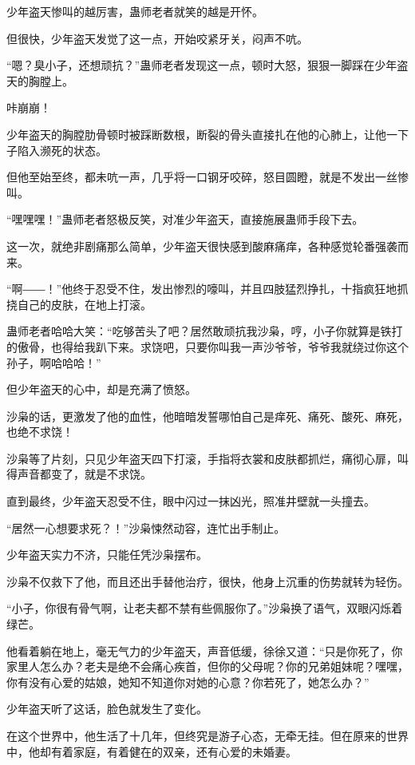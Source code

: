 
\begin{this_body}

少年盗天惨叫的越厉害，蛊师老者就笑的越是开怀。

但很快，少年盗天发觉了这一点，开始咬紧牙关，闷声不吭。

“嗯？臭小子，还想顽抗？”蛊师老者发现这一点，顿时大怒，狠狠一脚踩在少年盗天的胸膛上。

咔崩崩！

少年盗天的胸膛肋骨顿时被踩断数根，断裂的骨头直接扎在他的心肺上，让他一下子陷入濒死的状态。

但他至始至终，都未吭一声，几乎将一口钢牙咬碎，怒目圆瞪，就是不发出一丝惨叫。

“嘿嘿嘿！”蛊师老者怒极反笑，对准少年盗天，直接施展蛊师手段下去。

这一次，就绝非剧痛那么简单，少年盗天很快感到酸麻痛痒，各种感觉轮番强袭而来。

“啊――！”他终于忍受不住，发出惨烈的嚎叫，并且四肢猛烈挣扎，十指疯狂地抓挠自己的皮肤，在地上打滚。

蛊师老者哈哈大笑：“吃够苦头了吧？居然敢顽抗我沙枭，哼，小子你就算是铁打的傲骨，也得给我趴下来。求饶吧，只要你叫我一声沙爷爷，爷爷我就绕过你这个孙子，啊哈哈哈！”

但少年盗天的心中，却是充满了愤怒。

沙枭的话，更激发了他的血性，他暗暗发誓哪怕自己是痒死、痛死、酸死、麻死，也绝不求饶！

沙枭等了片刻，只见少年盗天四下打滚，手指将衣裳和皮肤都抓烂，痛彻心扉，叫得声音都变了，就是不求饶。

直到最终，少年盗天忍受不住，眼中闪过一抹凶光，照准井壁就一头撞去。

“居然一心想要求死？！”沙枭悚然动容，连忙出手制止。

少年盗天实力不济，只能任凭沙枭摆布。

沙枭不仅救下了他，而且还出手替他治疗，很快，他身上沉重的伤势就转为轻伤。

“小子，你很有骨气啊，让老夫都不禁有些佩服你了。”沙枭换了语气，双眼闪烁着绿芒。

他看着躺在地上，毫无气力的少年盗天，声音低缓，徐徐又道：“只是你死了，你家里人怎么办？老夫是绝不会痛心疾首，但你的父母呢？你的兄弟姐妹呢？嘿嘿，你有没有心爱的姑娘，她知不知道你对她的心意？你若死了，她怎么办？”

少年盗天听了这话，脸色就发生了变化。

在这个世界中，他生活了十几年，但终究是游子心态，无牵无挂。但在原来的世界中，他却有着家庭，有着健在的双亲，还有心爱的未婚妻。


\end{this_body}

